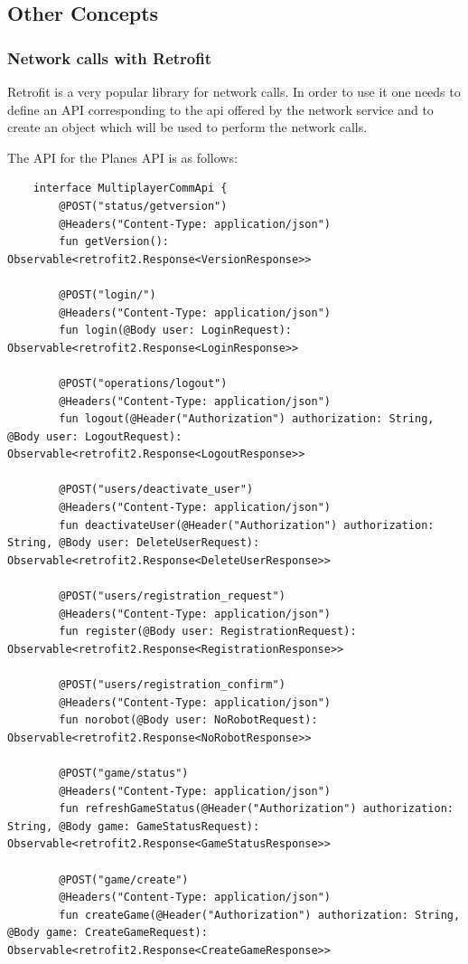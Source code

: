 \subsection { Other Concepts }

\subsubsection { Network calls with Retrofit } \label{network_calls}

Retrofit is a very popular library for network calls. In order to use it one needs to define an API corresponding to the api offered by the network service and to create an object which will be used to perform the network calls.

The API for the Planes API is as follows:

\begin{lstlisting} 
	interface MultiplayerCommApi {
		@POST("status/getversion")
		@Headers("Content-Type: application/json")
		fun getVersion(): Observable<retrofit2.Response<VersionResponse>>
		
		@POST("login/")
		@Headers("Content-Type: application/json")
		fun login(@Body user: LoginRequest): Observable<retrofit2.Response<LoginResponse>>
		
		@POST("operations/logout")
		@Headers("Content-Type: application/json")
		fun logout(@Header("Authorization") authorization: String, @Body user: LogoutRequest): Observable<retrofit2.Response<LogoutResponse>>
		
		@POST("users/deactivate_user")
		@Headers("Content-Type: application/json")
		fun deactivateUser(@Header("Authorization") authorization: String, @Body user: DeleteUserRequest): Observable<retrofit2.Response<DeleteUserResponse>>
		
		@POST("users/registration_request")
		@Headers("Content-Type: application/json")
		fun register(@Body user: RegistrationRequest): Observable<retrofit2.Response<RegistrationResponse>>
		
		@POST("users/registration_confirm")
		@Headers("Content-Type: application/json")
		fun norobot(@Body user: NoRobotRequest): Observable<retrofit2.Response<NoRobotResponse>>
		
		@POST("game/status")
		@Headers("Content-Type: application/json")
		fun refreshGameStatus(@Header("Authorization") authorization: String, @Body game: GameStatusRequest): Observable<retrofit2.Response<GameStatusResponse>>
		
		@POST("game/create")
		@Headers("Content-Type: application/json")
		fun createGame(@Header("Authorization") authorization: String, @Body game: CreateGameRequest): Observable<retrofit2.Response<CreateGameResponse>>
		

\end{lstlisting}
